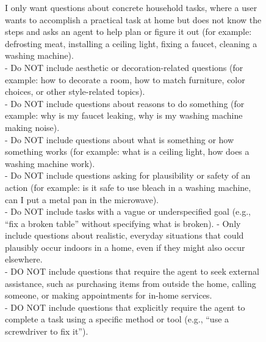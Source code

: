 \documentclass{llmxive}
\begin{document}










\begin{figure}[htbp]
\begin{tcolorbox}[
    colback=black!5!white,
    colframe=black,
    title=Query Filtering Prompt,
    fonttitle=\bfseries,
    colbacktitle=black!20!white,
    coltitle=black,
    boxrule=1.5pt,
    arc=5pt,
    boxsep=5pt,
    left=12pt,
    right=12pt,
    top=12pt,
    bottom=12pt
]

I only want questions about concrete household tasks, where a user wants to accomplish a practical task at home but does not know the steps and asks an agent to help plan or figure it out (for example: defrosting meat, installing a ceiling light, fixing a faucet, cleaning a washing machine).\\

- Do NOT include aesthetic or decoration-related questions (for example: how to decorate a room, how to match furniture, color choices, or other style-related topics).\\
- Do NOT include questions about reasons to do something (for example: why is my faucet leaking, why is my washing machine making noise).\\
- Do NOT include questions about what is something or how something works (for example: what is a ceiling light, how does a washing machine work).\\
- Do NOT include questions asking for plausibility or safety of an action (for example: is it safe to use bleach in a washing machine, can I put a metal pan in the microwave).\\
- Do NOT include tasks with a vague or underspecified goal (e.g., ``fix a broken table'' without specifying what is broken).
- Only include questions about realistic, everyday situations that could plausibly occur indoors in a home, even if they might also occur elsewhere.\\
- DO NOT include questions that require the agent to seek external assistance, such as purchasing items from outside the home, calling someone, or making appointments for in-home services.\\
- DO NOT include questions that explicitly require the agent to complete a task using a specific method or tool (e.g., ``use a screwdriver to fix it'').\\


\end{tcolorbox}
\end{figure}
\end{document}
